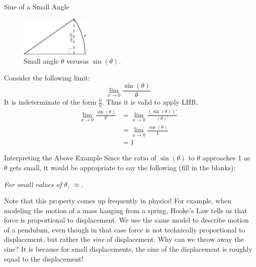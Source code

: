 \begin{example}{Sine of a Small Angle}
\begin{figure}
    	\centering
		\includegraphics[width=0.3\textwidth]{ChapterGeom/Figures/GAI-smallAngle}
        \caption*{Small angle $\theta$ verusus $\sin(\theta).$}
\end{figure}

 Consider the following limit: $$ \lim_{x\rightarrow 0}\frac{\sin(\theta)}{\theta}$$
It is indeterminate of the form $\frac{0}{0}$.  Thus it is valid to apply LHR. \begin{align*}
\lim_{x\rightarrow 0}\frac{\sin(\theta)}{\theta} &=\lim_{x\rightarrow 0}\frac{\left(\sin(\theta)\right)'}{\left(\theta\right)'} \\
&=\lim_{x\rightarrow 0}\frac{\cos(\theta)}{1} \\
&=1
\end{align*}
    
    
\end{example}
\begin{exercise}{Interpreting the Above Example \Coffeecup}
Since the ratio of $\sin(\theta)$ to $\theta$ approaches 1 as $\theta$ gets small, it would be appropriate to say the following (fill in the blanks):
\begin{center}
\emph{For small values of $\theta$, \underline{\hspace{1in}}$\approx$\underline{\hspace{1in}}.}
\end{center}
\end{exercise}
Note that this property comes up frequently in physics!  For example, when modeling the motion of a mass hanging from a spring, Hooke's Law tells us that force is proportional to displacement.  We use the same model to describe motion of a pendulum, even though in that case force is not technically proportional to displacement, but rather the \emph{sine} of displacement.  Why can we throw away the sine?  It is because for small displacements, the sine of the displacement is roughly equal to the displacement!

